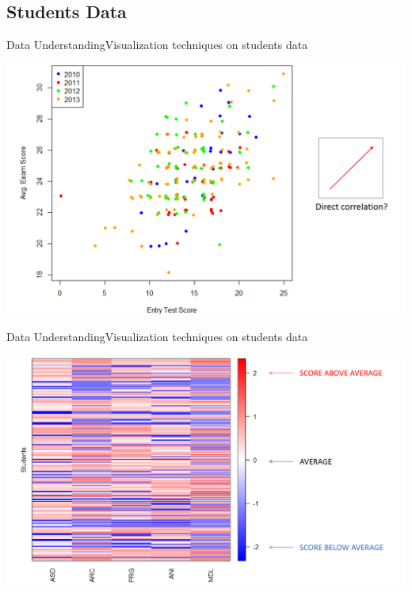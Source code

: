 \subsection{Students Data}
\begin{frame}{Data Understanding}{Visualization techniques on students data}

    \vspace{0.2cm}
    \begin{centering}
        \includegraphics[scale=0.28]{img2.png}
    \end{centering}

\end{frame}

\begin{frame}{Data Understanding}{Visualization techniques on students data}

    \vspace{0.5cm}
    \noindent\begin{centering}
        \includegraphics[scale=0.25]{img3.png}
    \end{centering}

\end{frame}

